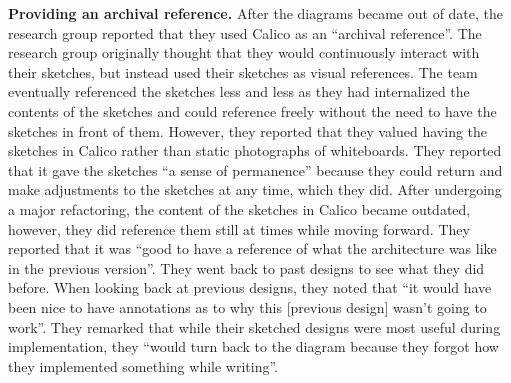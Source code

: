 \documentclass[12pt,fleqn]{ucithesis}
\begin{document}

\textbf{Providing an archival reference.} After the diagrams became out of date, the research group reported that they used Calico as an ``archival reference''. The research group originally thought that they would continuously interact with their sketches, but instead used their sketches as visual references. The team eventually referenced the sketches less and less as they had internalized the contents of the sketches and could reference freely without the need to have the sketches in front of them. However, they reported that they valued having the sketches in Calico rather than static photographs of whiteboards. They reported that it gave the sketches ``a sense of permanence'' because they could return and make adjustments to the sketches at any time, which they did. After undergoing a major refactoring, the content of the sketches in Calico became outdated, however, they did reference them still at times while moving forward. They reported that it was ``good to have a reference of what the architecture was like in the previous version''. They went back to past designs to see what they did before. When looking back at previous designs, they noted that ``it would have been nice to have annotations as to why this [previous design] wasn't going to work''. They remarked that while their sketched designs were most useful during implementation, they ``would turn back to the diagram because they forgot how they implemented something while writing''.

\end{document}
